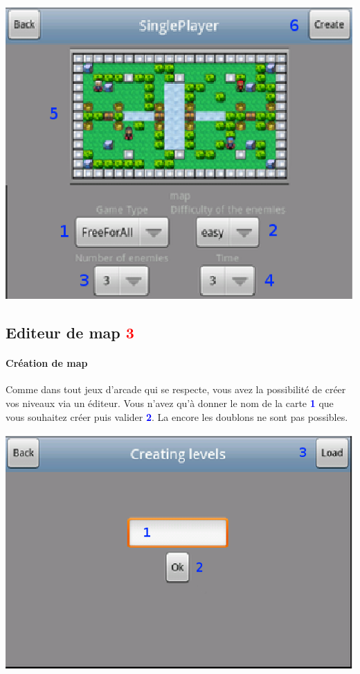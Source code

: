 	\begin{end}
		\includegraphics[scale=0.7]{Manuel/Img/15.eps}
	\end{end}
	
	
\subsection{Editeur de map \textcolor{red}{3} }
	
	\paragraph{Création de map\\}
	Comme dans tout jeux d'arcade qui se respecte, vous avez la possibilité de
	créer vos niveaux via un éditeur. Vous n'avez qu'à donner le nom de la carte
	\textcolor{blue}{\textbf{1}}	que vous souhaitez créer puis valider
	\textcolor{blue}{\textbf{2}}. La encore les doublons ne sont pas possibles.
	
	\begin{center}
			\includegraphics[scale=0.7]{Manuel/Img/10.eps}
	\end{center}


